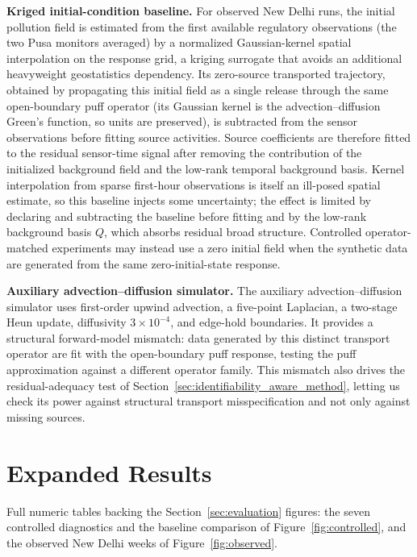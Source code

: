 \noindent\textbf{Kriged initial-condition baseline.}
For observed New Delhi runs, the initial pollution field is estimated from the
first available regulatory observations (the two Pusa monitors averaged) by a
normalized Gaussian-kernel spatial interpolation on the response grid, a kriging
surrogate that avoids an additional heavyweight geostatistics dependency.  Its
zero-source transported trajectory, obtained by propagating this initial field as
a single release through the same open-boundary puff operator (its Gaussian kernel
is the advection--diffusion Green's function, so units are preserved), is
subtracted from the sensor observations before fitting source activities.  Source
coefficients are therefore fitted to the residual sensor-time signal after
removing the contribution of the initialized background field and the low-rank
temporal background basis.  Kernel interpolation from sparse first-hour
observations is itself an ill-posed spatial estimate, so this baseline injects
some uncertainty; the effect is limited by declaring and subtracting the baseline
before fitting and by the low-rank background basis \(Q\), which absorbs residual
broad structure.  Controlled operator-matched experiments may instead use a zero
initial field when the synthetic data are generated from the same
zero-initial-state response.

\noindent\textbf{Auxiliary advection--diffusion simulator.}
The auxiliary advection--diffusion simulator uses first-order upwind advection, a
five-point Laplacian, a two-stage Heun update, diffusivity \(3\times10^{-4}\), and
edge-hold boundaries.  It provides a structural forward-model mismatch: data
generated by this distinct transport operator are fit with the open-boundary puff
response, testing the puff approximation against a different operator family.
This mismatch also drives the residual-adequacy test of
Section~\ref{sec:identifiability_aware_method}, letting us check its power against structural
transport misspecification and not only against missing sources.

\section{Expanded Results}
\label{app:expanded_results}

Full numeric tables backing the Section~\ref{sec:evaluation} figures: the seven
controlled diagnostics and the baseline comparison of Figure~\ref{fig:controlled},
and the observed New Delhi weeks of Figure~\ref{fig:observed}.

